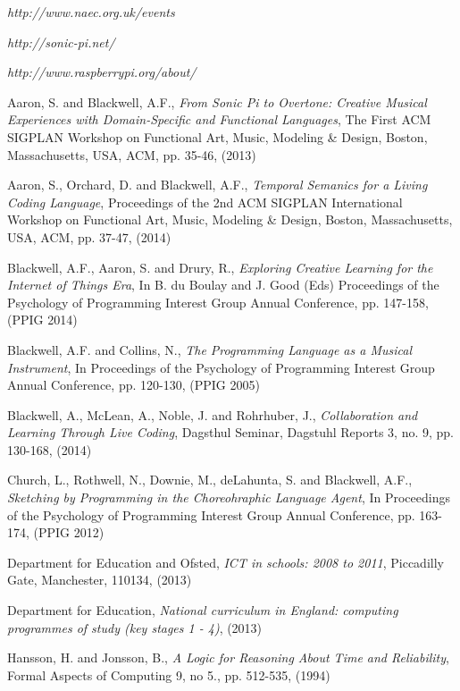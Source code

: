 \documentclass[11pt]{scrartcl}
\begin{document}
\begin{thebibliography}{9}

  \emph{http://www.naec.org.uk/events}

  \emph{http://sonic-pi.net/}

  \emph{http://www.raspberrypi.org/about/}

  Aaron, S. and Blackwell, A.F.,
  \emph{From Sonic Pi to Overtone: Creative Musical Experiences with Domain-Specific and Functional Languages},
  The First ACM SIGPLAN Workshop on Functional Art, Music, Modeling \& Design,
  Boston, Massachusetts, USA,
  ACM, pp. 35-46,
  (2013)

  Aaron, S., Orchard, D. and Blackwell, A.F.,
  \emph{Temporal Semanics for a Living Coding Language},
  Proceedings of the 2nd ACM SIGPLAN International Workshop on Functional Art, Music, Modeling \& Design,
  Boston, Massachusetts, USA,
  ACM, pp. 37-47,
  (2014)

  Blackwell, A.F., Aaron, S. and Drury, R., 
  \emph{Exploring Creative Learning for the Internet of Things Era},
  In B. du Boulay and J. Good (Eds) Proceedings of the Psychology of Programming Interest Group Annual Conference, 
  pp. 147-158,
  (PPIG 2014)

  Blackwell, A.F. and Collins, N.,
  \emph{The Programming Language as a Musical Instrument},
  In Proceedings of the Psychology of Programming Interest Group Annual Conference,
  pp. 120-130,
  (PPIG 2005)

  Blackwell, A., McLean, A., Noble, J. and Rohrhuber, J.,
  \emph{Collaboration and Learning Through Live Coding},
  Dagsthul Seminar, Dagstuhl Reports 3,
  no. 9, pp. 130-168,
  (2014)

  Church, L., Rothwell, N., Downie, M., deLahunta, S. and Blackwell, A.F.,
  \emph{Sketching by Programming in the Choreohraphic Language Agent},
  In Proceedings of the Psychology of Programming Interest Group Annual Conference,
  pp. 163-174,
  (PPIG 2012)

  Department for Education and Ofsted,
  \emph{ICT in schools: 2008 to 2011},
  Piccadilly Gate,
  Manchester,
  110134,
  (2013)

  Department for Education,
  \emph{National curriculum in England: computing programmes of study (key stages 1 - 4)},
  (2013)

  Hansson, H. and Jonsson, B.,
  \emph{A Logic for Reasoning About Time and Reliability},
  Formal Aspects of Computing 9,
  no 5., pp. 512-535,
  (1994)


\end{thebibliography}
\end{document}
